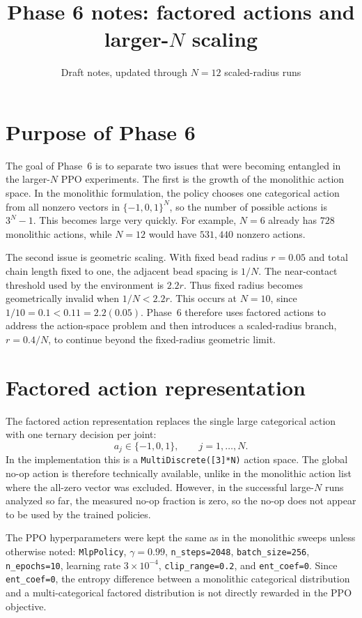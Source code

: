 \documentclass[11pt]{article}
\title{Phase 6 notes: factored actions and larger-$N$ scaling}
\author{}
\date{Draft notes, updated through  $N=12$ scaled-radius runs}
\begin{document}
\maketitle

\section{Purpose of Phase 6}

The goal of Phase~6 is to separate two issues that were becoming entangled in the larger-$N$ PPO experiments. The first is the growth of the monolithic action space. In the monolithic formulation, the policy chooses one categorical action from all nonzero vectors in $\{-1,0,1\}^N$, so the number of possible actions is $3^N-1$. This becomes large very quickly. For example, $N=6$ already has $728$ monolithic actions, while $N=12$ would have $531{,}440$ nonzero actions.

The second issue is geometric scaling. With fixed bead radius $r=0.05$ and total chain length fixed to one, the adjacent bead spacing is $1/N$. The near-contact threshold used by the environment is $2.2r$. Thus fixed radius becomes geometrically invalid when $1/N < 2.2r$. This occurs at $N=10$, since $1/10=0.1 < 0.11=2.2(0.05)$. Phase~6 therefore uses factored actions to address the action-space problem and then introduces a scaled-radius branch, $r=0.4/N$, to continue beyond the fixed-radius geometric limit.

\section{Factored action representation}

The factored action representation replaces the single large categorical action with one ternary decision per joint:
\begin{equation}
 a_j \in \{-1,0,1\}, \qquad j=1,\ldots,N .
\end{equation}
In the implementation this is a \texttt{MultiDiscrete([3]*N)} action space. The global no-op action is therefore technically available, unlike in the monolithic action list where the all-zero vector was excluded. However, in the successful large-$N$ runs analyzed so far, the measured no-op fraction is zero, so the no-op does not appear to be used by the trained policies.

The PPO hyperparameters were kept the same as in the monolithic sweeps unless otherwise noted: \texttt{MlpPolicy}, $\gamma=0.99$, \texttt{n\_steps=2048}, \texttt{batch\_size=256}, \texttt{n\_epochs=10}, learning rate $3\times 10^{-4}$, \texttt{clip\_range=0.2}, and \texttt{ent\_coef=0}. Since \texttt{ent\_coef=0}, the entropy difference between a monolithic categorical distribution and a multi-categorical factored distribution is not directly rewarded in the PPO objective.
\end{document}
